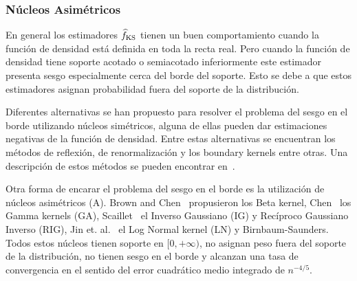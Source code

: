 

\subsubsection{Núcleos Asimétricos}

En general los estimadores $\widehat{f}_{\tiny \text {KS}}$ tienen un buen comportamiento cuando la función de densidad está definida en toda la recta real. Pero cuando la función de densidad tiene soporte acotado o semiacotado inferiormente este estimador presenta sesgo especialmente cerca del borde del soporte. Esto se debe a que estos estimadores asignan probabilidad fuera del soporte de la distribución.

Diferentes alternativas se han propuesto para resolver el problema del sesgo en el borde utilizando núcleos simétricos, alguna de ellas pueden dar estimaciones negativas de la función de densidad. Entre estas alternativas se encuentran los métodos de reflexión, de renormalización y los boundary kernels entre otras. Una descripción de estos métodos se pueden encontrar en~\cite{Jones1993}.


Otra forma de encarar el problema del sesgo en el borde es la utilización de núcleos asimétricos (A). Brown and Chen~\cite{Brown1999,chen1999} propusieron los Beta kernel, Chen~\cite{chensx2000} los Gamma kernels (GA), Scaillet~\cite{Scaillet2004} el Inverso Gaussiano (IG) y Recíproco Gaussiano Inverso (RIG), Jin et. al.~\cite{Jin2003} el Log Normal kernel (LN) y Birnbaum-Saunders. Todos estos núcleos tienen soporte en $[0,+\infty)$, no asignan peso fuera del soporte de la distribución, no tienen sesgo en el borde y alcanzan una tasa de convergencia en el sentido del error cuadrático medio integrado de $n^{-4/5}.$

